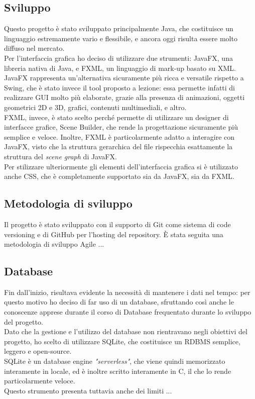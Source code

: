 \documentclass[12pt,a4paper]{article}
\begin{document}
	\subsection{Sviluppo} 
	Questo progetto è stato sviluppato principalmente Java, che costituisce un linguaggio estremamente vario e flessibile, e ancora oggi risulta essere molto diffuso nel mercato.\\Per l'interfaccia grafica ho deciso di utilizzare due strumenti: JavaFX, una libreria nativa di Java, e FXML, un linguaggio di mark-up basato su XML. \\JavaFX rappresenta un'alternativa sicuramente più ricca e versatile rispetto a Swing, che è stato invece il tool proposto a lezione: essa permette infatti di realizzare GUI molto più elaborate, grazie alla presenza di animazioni, oggetti geometrici 2D e 3D, grafici, contenuti multimediali, e altro.\\FXML, invece, è stato scelto perché permette di utilizzare un designer di interfacce grafice, Scene Builder, che rende la progettazione sicuramente più semplice e veloce. Inoltre, FXML è particolarmente adatto a interagire con JavaFX, visto che la struttura gerarchica del file rispecchia esattamente la struttura del \textit{scene graph} di JavaFX.\\
	Per stilizzare ulteriormente gli elementi dell'interfaccia grafica si è utilizzato anche CSS, che è completamente supportato sia da JavaFX, sia da FXML.
	\subsection{Metodologia di sviluppo}
	Il progetto è stato sviluppato con il supporto di Git come sistema di code versioning e di GitHub per l'hosting del repository.
	È stata seguita una metodologia di sviluppo Agile ...
	\subsection{Database}
	Fin dall'inizio, risultava evidente la necessità di mantenere i dati nel tempo: per questo motivo ho deciso di far uso di un database, sfruttando così anche le conoscenze apprese durante il corso di Database frequentato durante lo sviluppo del progetto.\\
	Dato che la gestione e l'utilizzo del database non rientravano negli obiettivi del progetto, ho scelto di utilizzare SQLite, che costituisce un RDBMS semplice, leggero e open-source.\\
	SQLite è un database engine \textit{"serverless"}, che viene quindi memorizzato interamente in locale, ed è inoltre scritto interamente in C, il che lo rende particolarmente veloce.\\
	Questo strumento presenta tuttavia anche dei limiti ... \\
\end{document}
